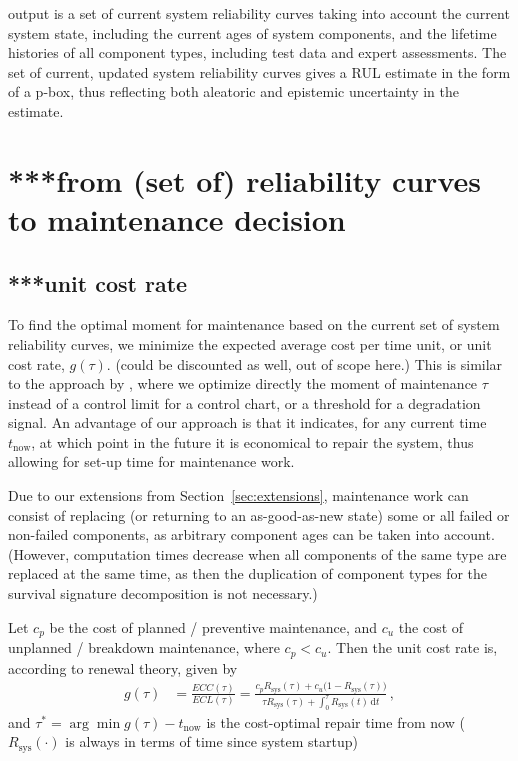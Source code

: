 \documentclass[authoryear]{elsarticle}
\newcommand{\dd}{\,\mathrm{d}}
\newcommand{\Rsys}{R_\text{sys}}
\def\tnow{t_\text{now}}
\begin{document}
output is a set of current system reliability curves
taking into account the current system state,
including the current ages of system components, 
and the lifetime histories of all component types,
including test data and expert assessments.
The set of current, updated system reliability curves gives a RUL estimate
in the form of a p-box, thus reflecting both aleatoric and epistemic uncertainty in the estimate.


\section{***from (set of) reliability curves to maintenance decision}

\subsection{***unit cost rate}

To find the optimal moment for maintenance based on the current set of system reliability curves,
we minimize the expected average cost per time unit,
or unit cost rate, $g(\tau)$. (could be discounted as well, out of scope here.)
This is similar to the approach by \cite{2011:kim-et-al},
where we optimize directly the moment of maintenance $\tau$
instead of a control limit for a control chart, or a threshold for a degradation signal.
An advantage of our approach is that
it indicates, for any current time $\tnow$, at which point in the future it is economical to repair the system,
thus allowing for set-up time for maintenance work.

Due to our extensions from Section~\ref{sec:extensions},
maintenance work can consist of replacing (or returning to an as-good-as-new state) some or all failed or non-failed components,
as arbitrary component ages can be taken into account.
(However, computation times decrease when all components of the same type are replaced at the same time,
as then the duplication of component types for the survival signature decomposition is not necessary.)

Let $c_p$ be the cost of planned / preventive maintenance, and $c_u$ the cost of unplanned / breakdown maintenance, where $c_p < c_u$.
Then the unit cost rate is, according to renewal theory, given by
\begin{align}
g(\tau) &= \frac{ECC(\tau)}{ECL(\tau)} = \frac{c_p \Rsys(\tau) + c_u \big(1-\Rsys(\tau)\big)}{\tau \Rsys(\tau) + \int_0^\tau \Rsys(t) \dd t}\,,
\end{align}
and $\tau^* = \arg\min g(\tau) - \tnow$ is the cost-optimal repair time from now
($\Rsys(\cdot)$ is always in terms of time since system startup)
\end{document}
